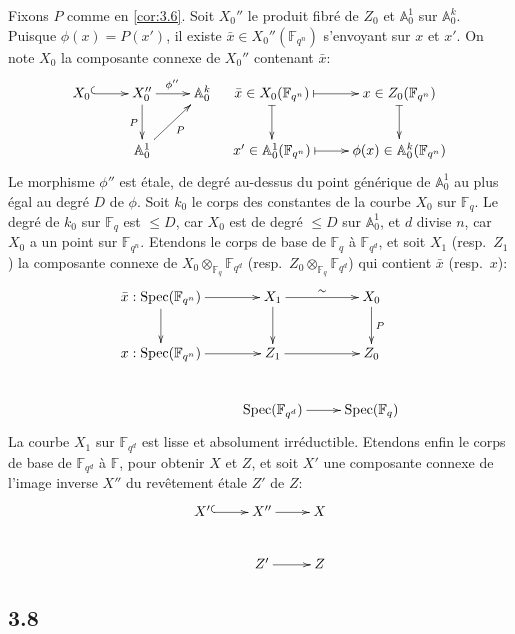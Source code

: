 \documentclass[11pt,a4paper]{article}
\theoremstyle{plain}
\theoremstyle{definition}
\DeclareMathOperator{\Spec}{Spec}
\begin{document}
Fixons $P$ comme en \ref{cor:3.6}. Soit $X_0''$ le produit fibr\'e de $Z_0$ et $\mathbb{A}_0^1$ sur $\mathbb{A}_0^k$. Puisque $\phi(x) = P(x')$, il existe $\bar{x} \in X_0''(\mathbb{F}_{q^n})$ s'envoyant sur $x$ et $x'$. On note $X_0$ la composante connexe de $X_0''$ contenant $\bar{x}$:
\begin{equation}\label{eq:3.7.1}
\xymatrix{
X_0 \ar@{^{(}->}[r] & X_0'' \ar[r]^{\phi''} \ar[d]_{P} & \mathbb{A}_0^k \\
& \mathbb{A}_0^1 \ar[ur]_{P} &
}
\quad
\xymatrix{
\bar{x} \in X_0(\mathbb{F}_{q^n}) \ar@{|->}[d] \ar@{|->}[r] & x \in Z_0(\mathbb{F}_{q^n}) \ar@{|->}[d] \\
x' \in \mathbb{A}_0^1(\mathbb{F}_{q^n}) \ar@{|->}[r] & \phi(x) \in \mathbb{A}_0^k(\mathbb{F}_{q^n})
}
\end{equation}
Le morphisme $\phi''$ est \'etale, de degr\'e au-dessus du point g\'en\'erique de $\mathbb{A}_0^1$ au plus \'egal au degr\'e $D$ de $\phi$. Soit $k_0$ le corps des constantes de la courbe $X_0$ sur $\mathbb{F}_q$. Le degr\'e de $k_0$ sur $\mathbb{F}_q$ est $\leq D$, car $X_0$ est de degr\'e $\leq D$ sur $\mathbb{A}_0^1$, et $d$ divise $n$, car $X_0$ a un point sur $\mathbb{F}_{q^n}$. Etendons le corps de base de $\mathbb{F}_q$ \`a $\mathbb{F}_{q^d}$, et soit $X_1$ (resp.~$Z_1$) la composante connexe de $X_0 \otimes_{\mathbb{F}_q} \mathbb{F}_{q^d}$ (resp.~$Z_0 \otimes_{\mathbb{F}_q} \mathbb{F}_{q^d}$) qui contient $\bar{x}$ (resp.~$x$):
\begin{equation}\label{eq:3.7.2}
\xymatrix{
\bar{x}: \Spec(\mathbb{F}_{q^n}) \ar[r] \ar[d] & X_1 \ar[r]^{\sim} \ar[d] & X_0 \ar[d]^{P} \\
x: \Spec(\mathbb{F}_{q^n}) \ar[r] & Z_1 \ar[r] & Z_0 \\
& \Spec(\mathbb{F}_{q^d}) \ar[r] & \Spec(\mathbb{F}_q)
}
\end{equation}
La courbe $X_1$ sur $\mathbb{F}_{q^d}$ est lisse et absolument irr\'eductible. Etendons enfin le corps de base de $\mathbb{F}_{q^d}$ \`a $\mathbb{F}$, pour obtenir $X$ et $Z$, et soit $X'$ une composante connexe de l'image inverse $X''$ du rev\^etement \'etale $Z'$ de $Z$:
\begin{equation}\label{eq:3.7.3}
\xymatrix{
X' \ar@{^{(}->}[r] & X'' \ar[r] & X \\
& Z' \ar[r] & Z
}
\end{equation}

\subsection*{3.8}
\end{document}
